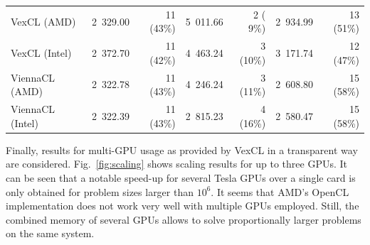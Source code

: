 \documentclass[final]{siamltex}
\newcommand{\figref}[1]{Fig.~\ref{#1}}
\begin{document}
\begin{table}
\begin{small}
\begin{tabular}{|l|rrrrrr|}
        VexCL    (AMD)   & 2~329.00 &  11 (43\%) & 5~011.66 &   2 ( 9\%) & 2~934.99 &  13 (51\%) \\
        VexCL    (Intel) & 2~372.70 &  11 (42\%) & 4~463.24 &   3 (10\%) & 3~171.74 &  12 (47\%) \\
        ViennaCL (AMD)   & 2~322.78 &  11 (43\%) & 4~246.24 &   3 (11\%) & 2~608.80 &  15 (58\%) \\
        ViennaCL (Intel) & 2~322.39 &  11 (43\%) & 2~815.23 &   4 (16\%) & 2~580.47 &  15 (58\%) \\
        \hline
    \end{tabular}
    \end{small}
\end{table}


Finally, results for multi-GPU usage as provided by VexCL in a transparent way
are considered. \figref{fig:scaling} shows scaling results for up to three
GPUs. It can be seen that a notable speed-up for several Tesla GPUs over a
single card is only obtained for problem sizes larger than $10^6$.  It seems
that AMD's OpenCL implementation does not work very well with multiple GPUs
employed. Still, the combined memory of several GPUs allows to solve proportionally
larger problems on the same system.
\end{document}
